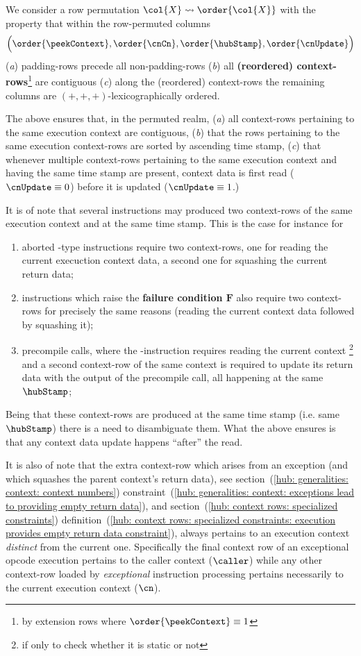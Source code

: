 We consider a row permutation $\col{X}\rightsquigarrow\order{\col{X}}$ with the property that within the row-permuted columns
\[
	\Big(
	\order{\peekContext},
	\order{\cnCn},
	\order{\hubStamp},
	\order{\cnUpdate}
	\Big)
\]
(\emph{a}) padding-rows precede all non-padding-rows
(\emph{b}) all \textbf{(reordered) context-rows}\footnote{by extension rows where $\order{\peekContext} \equiv 1$} are contiguous
(\emph{c}) along the (reordered) context-rows the remaining columns are $(+, +, +)$-lexicographically ordered.

\saNote{}
The above ensures that, in the permuted realm,
(\emph{a}) all context-rows pertaining to the same execution context are contiguous,
(\emph{b}) that the rows pertaining to the same execution context-rows are sorted by ascending time stamp,
(\emph{c}) that whenever multiple context-rows pertaining to the same execution context and having the same time stamp are present,
context data is first read ($\cnUpdate \equiv 0$) before it is updated ($\cnUpdate \equiv 1$.)

\saNote{}
It is of note that several instructions may produced two context-rows of the same execution context and at the same time stamp.
This is the case for instance for
\begin{enumerate}
	\item
		aborted -type instructions require two context-rows,
		one for reading the current execuction context data,
		a second one for squashing the current return data;
	\item
		 instructions which raise the \textbf{failure condition $\bm{F}$}
		also require two context-rows for precisely the same reasons
		(reading the current context data followed by squashing it);
        \item
		precompile calls, where the -instruction requires reading the current context%
		\footnote{if only to check whether it is static or not}
		and a second context-row of the same context is required to update its return data with the
		output of the precompile call, all happening at the same $\hubStamp$;
\end{enumerate}
Being that these context-rows are produced at the same time stamp (i.e. same $\hubStamp$) there is a need to disambiguate them.
What the above ensures is that any context data update happens ``after'' the read.

\saNote{}
It is also of note that the extra context-row which arises from an exception (and which squashes the parent context's return data),
see
section~(\ref{hub: generalities: context: context numbers})
constraint~(\ref{hub: generalities: context: exceptions lead to providing empty return data}), and
section~(\ref{hub: context rows: specialized constraints})
definition~(\ref{hub: context rows: specialized constraints: execution provides empty return data constraint}),
always pertains to an execution context \emph{distinct} from the current one.
Specifically the final context row of an exceptional opcode execution pertains to the caller context ($\caller$) while any other context-row
loaded by \emph{exceptional} instruction processing pertains necessarily to the current execution context ($\cn$).
